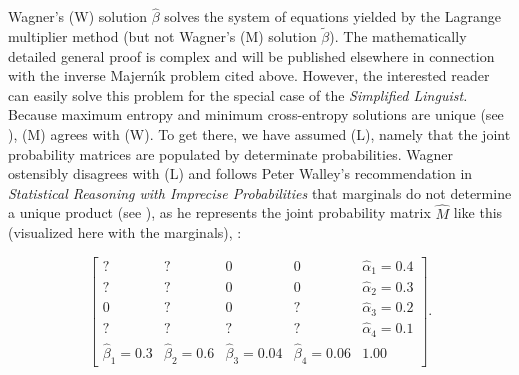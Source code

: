 \documentclass[11pt]{article}
\begin{document}



Wagner's (W) solution $\hat{\beta}$ solves the system of equations
yielded by the Lagrange multiplier method (but not Wagner's (M)
solution $\tilde{\beta}$). The mathematically detailed general proof
is complex and will be published elsewhere in connection with the
inverse Majern{\'\i}k problem cited above. However, the interested
reader can easily solve this problem for the special case of the
\emph{Simplified Linguist.} Because maximum entropy and minimum
cross-entropy solutions are unique (see ),
(M) agrees with (W). To get there, we have assumed (L), namely that
the joint probability matrices are populated by determinate
probabilities. Wagner ostensibly disagrees with (L) and follows Peter
Walley's recommendation in \emph{Statistical Reasoning with Imprecise
  Probabilities} that marginals do not determine a unique product (see
), as he represents the joint probability
matrix $\hat{M}$ like this (visualized here with the marginals), :

\begin{equation}
  \label{eq:p8}
      \left[
      \begin{array}{ccccc}
        ? & ? & 0 & 0 & \hat{\alpha}_{1}=0.4 \\
        ? & ? & 0 & 0 & \hat{\alpha}_{2}=0.3 \\
        0 & ? & 0 & ? & \hat{\alpha}_{3}=0.2 \\
        ? & ? & ? & ? & \hat{\alpha}_{4}=0.1 \\
        \hat{\beta}_{1}=0.3 & \hat{\beta}_{2}=0.6 & \hat{\beta}_{3}=0.04 & \hat{\beta}_{4}=0.06 & 1.00
      \end{array}
\right].
\end{equation}
\end{document}
